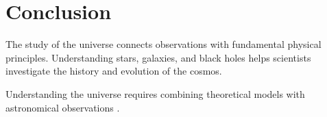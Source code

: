 \section{Conclusion}
The study of the universe connects observations with fundamental physical principles. Understanding stars, galaxies, and black holes helps scientists investigate the history and evolution of the cosmos.

Understanding the universe requires combining theoretical models with astronomical observations \parencite{hawking1988,carroll2007}.